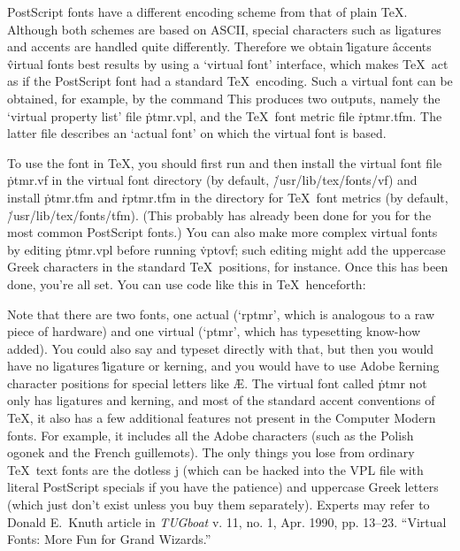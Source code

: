 PostScript fonts have a different encoding scheme from that of plain
\TeX. Although both schemes are based on ASCII, special characters such as
ligatures and accents are handled quite differently. Therefore we obtain
\^{ligature}
\^{accents}
\^{virtual fonts}
best results by using a `virtual font' interface, which makes \TeX\ act
as if the PostScript font had a standard \TeX\ encoding. Such a virtual
font can be obtained, for example, by the command
\noindent
This produces two outputs, namely the `virtual property list' file
\.{ptmr.vpl}, and the \TeX\ font metric file \.{rptmr.tfm}.
The latter file describes an `actual font' on which the virtual font is based.

To use the font in \TeX, you should first run
\noindent
and then install the virtual font file \.{ptmr.vf} in the virtual font
directory (by default, \.{/usr/lib/tex/fonts/vf}) and install \.{ptmr.tfm}
and \.{rptmr.tfm} in the directory for \TeX\ font metrics (by default,
\.{/usr/lib/tex/fonts/tfm}).  (This probably has already been done for you for
the most common PostScript fonts.)
You can also make more complex virtual fonts by editing
\.{ptmr.vpl} before running \.{vptovf}; such editing might add the uppercase
Greek characters in the standard \TeX\ positions, for instance.
Once this has been done, you're all set. You can use
code like this in \TeX\ henceforth:

Note that there are two fonts, one actual (`rptmr',
which is analogous to a raw piece of hardware) and one virtual
(`ptmr', which has typesetting know-how added). You could also say
\noindent
and typeset directly with that, but then you would have no ligatures
\^{ligature}
or kerning, and you would have to use Adobe
\^{kerning}
character positions for special letters like \AE. The virtual font
called \.{ptmr} not only has ligatures and kerning, and most of the
standard accent conventions of \TeX, it also has a few additional
features not present in the Computer Modern fonts. For example, it
includes all the Adobe characters (such as the Polish ogonek and the
French guillemots).  The only things you lose from ordinary \TeX\ text
fonts are the dotless j (which can be hacked into the VPL file with
literal PostScript specials if you have the patience) and uppercase
Greek letters (which just don't exist unless you buy them separately).
Experts may refer to Donald E.~Knuth article in {\it TUGboat} v. 11,
no. 1, Apr. 1990, pp. 13--23.  ``Virtual Fonts: More Fun for Grand
Wizards.''

